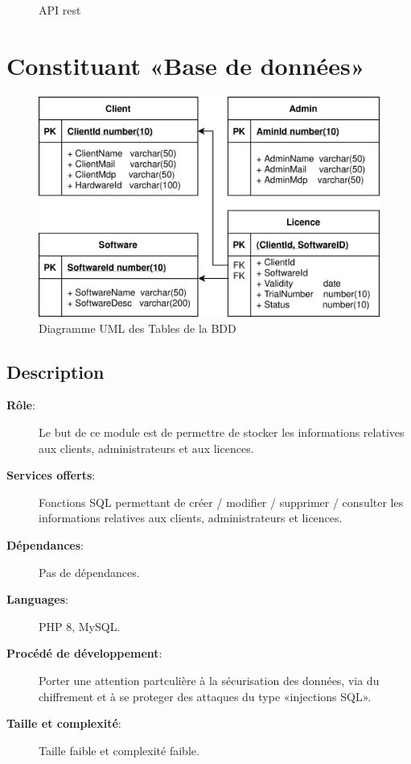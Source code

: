 \begin{figure}[hp!]
    \vspace{-0.5cm}
	\caption{API rest}
	
	\label{fig:fig2}
\end{figure}

\section{Constituant «Base de données»}

\begin{figure}[hp!]
	\centering
	\includegraphics[width=\textwidth - 2cm]{../png/SQL_table.png}
	\caption{Diagramme UML des Tables de la BDD}
	\label{fig:fig2}
\end{figure}

\subsection{Description}
\begin{description}
	\item[\textbf{Rôle}:]
		Le but de ce module est de permettre de stocker les informations relatives aux
		clients, administrateurs et aux licences.
	\item[\textbf{Services offerts}:]
		Fonctions SQL permettant de créer / modifier / supprimer / consulter les
		informations relatives aux clients, administrateurs et licences.
	\item[\textbf{Dépendances}:]
		Pas de dépendances.		
	\item[\textbf{Languages}:]
		PHP 8, MySQL.
	\item[\textbf{Procédé de développement}:]
	  Porter une attention partculière à la sécurisation des données, via
	  du chiffrement et à se proteger des attaques du type «injections SQL». 
	\item[\textbf{Taille et complexité}:]
		Taille faible et complexité faible. 
\end{description}

